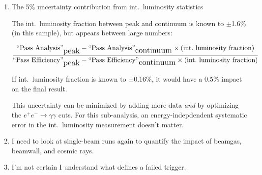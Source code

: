 \documentclass[landscape]{article}
\begin{document}
\begin{enumerate}
  \vfill
  \item The 5\% uncertainty contribution from int.\ luminosity statistics

  \vfill
  The int.\ luminosity fraction between peak and continuum is known to
  $\pm$1.6\% (in this sample), but appears between large numbers:

\[ \frac{\mbox{``Pass Analysis''}_{\mbox{\large peak}} - \mbox{``Pass Analysis''}_{\mbox{\large continuum}}
   \times (\mbox{int.\ luminosity fraction})}
   {\mbox{``Pass Efficiency''}_{\mbox{\large peak}} - \mbox{``Pass Efficiency''}_{\mbox{\large continuum}}
   \times (\mbox{int.\ luminosity fraction})} \]

  \vfill
  If int.\ luminosity fraction is known to $\pm$0.16\%, it would
  have a 0.5\% impact on the final result.

  \vfill
  This uncertainty can be minimized by adding more data {\it and} by
  optimizing the $e^+e^- \to \gamma \gamma$ cuts.  For this
  sub-analysis, an energy-indepdendent systematic error in the int.\
  luminosity measurement doesn't matter.

  \vfill
  \item I need to look at single-beam runs again to quantify the
  impact of beamgas, beamwall, and cosmic rays.

  \vfill
  \item I'm not certain I understand what defines a failed trigger.

  \vfill
\end{enumerate}
\end{document}
